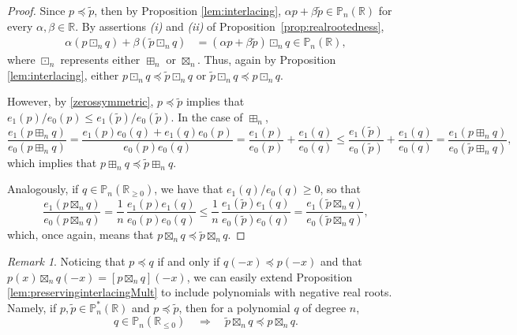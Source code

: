 \documentclass[reqno,11pt]{amsart}
\theoremstyle{remark}
\newtheorem{remark}[theorem]{Remark}
\renewcommand{\P}{\mathbb{P}}
\newcommand{\R}{\mathbb{R}}
\newcommand{\monicpolreal}{\mathbb P_n^*(\mathbb R)}
\newcommand{\pp}{\mathbb{P}}
\newcommand{\rr}{\mathbb{R}}
\begin{document}
\begin{proof}
Since $p\preccurlyeq\tilde{p}$, then by Proposition \ref{lem:interlacing}, $\alpha p+\beta \tilde{p}\in \pp_n(\rr)$ for every $\alpha,\beta\in \rr$. By assertions \textit{(i)} and \textit{(ii)} of Proposition~\ref{prop:realrootedness}, 
\begin{align*}
  \alpha (p  \boxdot_n  q) + \beta (\tilde{p}   \boxdot_n  q) & = (\alpha p+\beta \tilde{p}) \boxdot_n  q\in \pp_n(\rr), 
\end{align*}
where $ \boxdot_n $ represents either $\boxplus_n$ or $ \boxtimes_n $.
Thus, again by Proposition \ref{lem:interlacing}, either $p  \boxdot_n  q\preccurlyeq \tilde{p}  \boxdot_n  q $ or $\tilde{p}  \boxdot_n  q\preccurlyeq  p \boxdot_n  q$.

However, by \eqref{zerossymmetric}, $p\preccurlyeq\tilde{p}$ implies that $e_1(p) / e_0(p)\leq e_1(\tilde{p})/ e_0(\tilde{p})$. In the case of $\boxplus_n$, 
$$
\frac{e_1(p\boxplus_n q)}{e_0( p \boxplus_n q) }
=\frac{e_1(p)e_0( q ) +e_1(q) e_0( p ) }{e_0( p ) e_0(q)}
=\frac{e_1(p)  }{e_0( p )  } + \frac{e_1(q)  }{e_0( q )  } \leq \frac{e_1(\tilde p)  }{e_0( \tilde p )  } + \frac{e_1(q)  }{e_0( q )  } = \frac{e_1(p\boxplus_n q)}{e_0( \tilde p \boxplus_n q) } ,
$$ 
which implies that $p\boxplus_n q\preccurlyeq \tilde{p} \boxplus_n q $.

Analogously, if  $q\in \pp_n(\rr_{\ge 0})$, we have that $e_1(q)/e_0(q)\geq 0$, so that 
$$
\frac{e_1(p\boxtimes_n q)}{e_0(p\boxtimes_n q)} = \frac{1}{n}\, \frac{e_1(p) e_1(q)}{e_0(p ) e_0(q)}\leq \frac{1}{n}\, \frac{e_1(\tilde p) e_1(q)}{e_0(\tilde p ) e_0(q)} = \frac{e_1(\tilde p\boxtimes_n q)}{e_0(\tilde p\boxtimes_n q)},
$$ which, once again, means that $p\boxtimes_n q\preccurlyeq \tilde{p} \boxtimes_n q $. 
\end{proof}
\begin{remark}\label{preserveinterlacing.negativezeros}
Noticing that $p \preccurlyeq q$ if and only if $q(-x) \preccurlyeq p(-x)$ and that $p(x) \boxtimes_n q(-x)=[p\boxtimes_n q] (-x)$, we can easily extend Proposition \ref{lem:preservinginterlacingMult} to include polynomials with negative real roots. Namely, if $p, \widetilde{p}\in \monicpolreal$ and $p \preccurlyeq \widetilde{p}$, then for a polynomial $q$ of degree $n$, 
$$
q \in \P_n(\R_{\le 0}) \quad  \Rightarrow \quad \widetilde{p} \boxtimes_n q \preccurlyeq p \boxtimes_n q.
$$
\end{remark}
\end{document}

